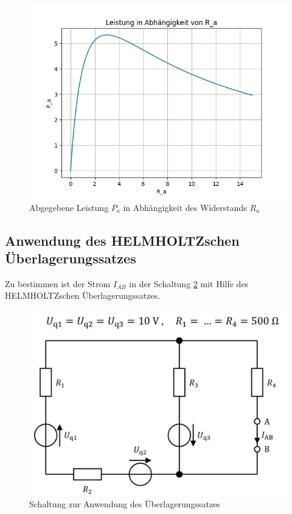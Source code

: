 \begin{figure}
    \centering
    \includegraphics[width=0.8\linewidth]{Bilder/abgegebeneLeistung.png}
    \caption{Abgegebene Leistung $P_a$ in Abhängigkeit des Widerstands $R_a$}
    \label{fig:abgegebeneLeistung}
\end{figure}

\subsection{Anwendung des HELMHOLTZschen Überlagerungssatzes}\label{sec:helmholtz}

Zu bestimmen ist der Strom $I_{AB}$ in der Schaltung \ref{fig:helmholtzSchaltung} mit Hilfe des HELMHOLTZschen Überlagerungssatzes.

\begin{figure}[ht]
    \centering
    \includegraphics[width=0.5\linewidth]{Bilder/Helmholtz.png}
    \caption{Schaltung zur Anwendung des Überlagerungssatzes\cite{Anleitung}}
    \label{fig:helmholtzSchaltung}
\end{figure}

